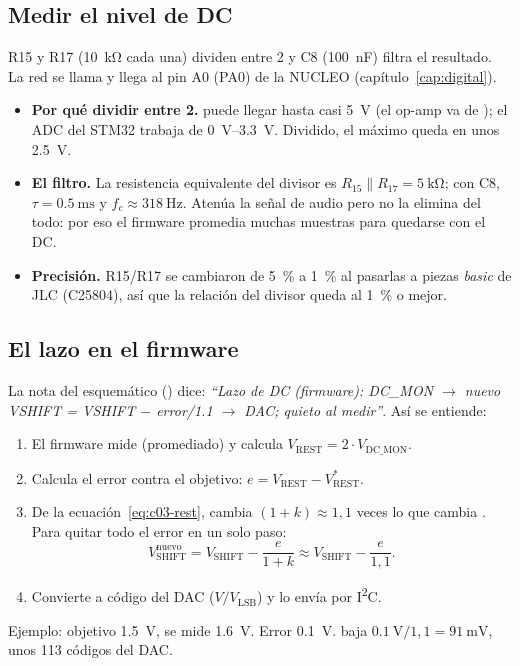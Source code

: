 \subsection{Medir el nivel de DC}

R15 y R17 (\SI{10}{\kilo\ohm} cada una) dividen  entre 2 y C8 (\SI{100}{\nano\farad}) filtra el
resultado. La red se llama  y llega al pin A0 (PA0) de la NUCLEO (capítulo~\ref{cap:digital}).
\begin{itemize}
  \item \textbf{Por qué dividir entre 2.}  puede llegar hasta casi \SI{5}{\volt} (el op-amp va de
        ); el ADC del STM32 trabaja de \SIrange{0}{3.3}{\volt}. Dividido, el máximo queda en unos
        \SI{2.5}{\volt}.
  \item \textbf{El filtro.} La resistencia equivalente del divisor es $R_{15}\parallel R_{17} = \SI{5}{\kilo\ohm}$; con C8,
        $\tau = \SI{0.5}{\milli\second}$ y $f_c \approx \SI{318}{\hertz}$. Atenúa la señal de audio pero no la elimina
        del todo: por eso el firmware promedia muchas muestras para quedarse con el DC.
  \item \textbf{Precisión.} R15/R17 se cambiaron de \SI{5}{\percent} a \SI{1}{\percent} al pasarlas a piezas
        \emph{basic} de JLC (C25804), así que la relación del divisor queda al \SI{1}{\percent} o mejor.
\end{itemize}

\subsection{El lazo en el firmware}

La nota del esquemático () dice: \emph{``Lazo de DC (firmware): DC\_MON $\to$ nuevo
VSHIFT = VSHIFT $-$ error/1.1 $\to$ DAC; quieto al medir''}. Así se entiende:

\begin{calculo}
\begin{enumerate}
  \item El firmware mide  (promediado) y calcula $V_{\mathrm{REST}} = 2\cdot V_{\mathrm{DC\_MON}}$.
  \item Calcula el error contra el objetivo: $e = V_{\mathrm{REST}} - V_{\mathrm{REST}}^{*}$.
  \item De la ecuación~\eqref{eq:c03-rest},  cambia $(1+k) \approx 1{,}1$ veces lo que cambia
        . Para quitar todo el error en un solo paso:
        \begin{equation*}
          V_{\mathrm{SHIFT}}^{\text{nuevo}} = V_{\mathrm{SHIFT}} - \frac{e}{1+k} \approx V_{\mathrm{SHIFT}} - \frac{e}{1{,}1}.
        \end{equation*}
  \item Convierte a código del DAC ($V/V_{\mathrm{LSB}}$) y lo envía por I\textsuperscript{2}C.
\end{enumerate}
Ejemplo: objetivo \SI{1.5}{\volt}, se mide \SI{1.6}{\volt}. Error \SI{0.1}{\volt}.  baja
$\SI{0.1}{\volt}/1{,}1 = \SI{91}{\milli\volt}$, unos 113 códigos del DAC.
\end{calculo}

